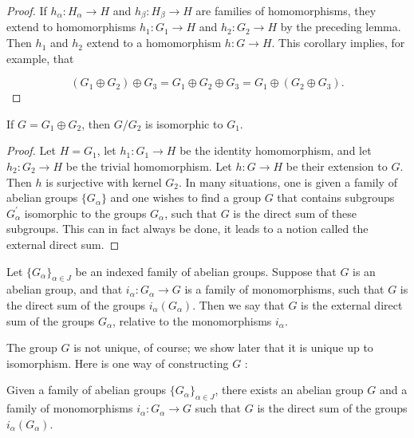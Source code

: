 \begin{proof}
If \(h_{\alpha } : H_{\alpha } \rightarrow H\) and \(h_{\beta } : H_{\beta } \rightarrow H\) are families of homomorphisms, they extend to homomorphisms \(h_{1} : G_{1} \rightarrow H\) and \(h_{2} : G_{2} \rightarrow H\) by the preceding lemma. Then \(h_{1}\) and \(h_{2}\) extend to a homomorphism \(h : G \rightarrow H\).
This corollary implies, for example, that

\[
( {G_{1} \oplus {G}_{2}}) \oplus {G}_{3} = G_{1} \oplus {G}_{2} \oplus {G}_{3} = G_{1} \oplus ( {G_{2} \oplus {G}_{3}}).
\]
\end{proof}
\begin{corollary}
\label{cor:\thetheorem}
If \(G = G_{1} \oplus {G}_{2}\), then \(G/G_{2}\) is isomorphic to \(G_{1}\).
\end{corollary}

\begin{proof}
Let \(H = G_{1}\), let \(h_{1} : G_{1} \rightarrow H\) be the identity homomorphism, and let \(h_{2} : G_{2} \rightarrow H\) be the trivial homomorphism. Let \(h : G \rightarrow H\) be their extension to \(G\). Then \(h\) is surjective with kernel \(G_{2}\).
In many situations, one is given a family of abelian groups \(\{ G_{\alpha }\}\) and one wishes to find a group \(G\) that contains subgroups \(G_{\alpha }^{\prime }\) isomorphic to the groups \(G_{\alpha }\), such that \(G\) is the direct sum of these subgroups. This can in fact always be done, it leads to a notion called the external direct sum.
\end{proof}
\begin{definition}
Let \({\{ G_{\alpha }\} }_{\alpha \in J}\) be an indexed family of abelian groups. Suppose that \(G\) is an abelian group, and that \(i_{\alpha } : G_{\alpha } \rightarrow G\) is a family of monomorphisms, such that \(G\) is the direct sum of the groups \(i_{\alpha }( G_{\alpha })\). Then we say that \(G\) is the external direct sum of the groups \(G_{\alpha }\), relative to the monomorphisms \(i_{\alpha }\).
\end{definition}

The group \(G\) is not unique, of course; we show later that it is unique up to isomorphism. Here is one way of constructing \(G\) :

\begin{theorem}
\label{thm:\thetheorem}
Given a family of abelian groups \({\{ G_{\alpha }\} }_{\alpha \in J}\), there exists an abelian group \(G\) and a family of monomorphisms \(i_{\alpha } : G_{\alpha } \rightarrow G\) such that \(G\) is the direct sum of the groups \(i_{\alpha }( G_{\alpha })\).
\end{theorem}

